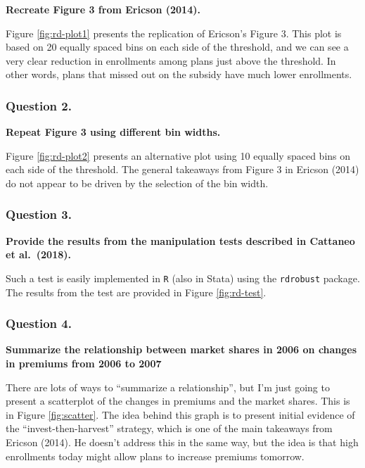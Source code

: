 \documentclass[
  12pt,
]{article}
\begin{document}
\textbf{Recreate Figure 3 from Ericson (2014).}

Figure \ref{fig:rd-plot1} presents the replication of Ericson's Figure 3. This plot is based on 20 equally spaced bins on each side of the threshold, and we can see a very clear reduction in enrollments among plans just above the threshold. In other words, plans that missed out on the subsidy have much lower enrollments.

\hypertarget{question-2.}{%
\subsubsection{Question 2.}\label{question-2.}}

\textbf{Repeat Figure 3 using different bin widths.}

Figure \ref{fig:rd-plot2} presents an alternative plot using 10 equally spaced bins on each side of the threshold. The general takeaways from Figure 3 in Ericson (2014) do not appear to be driven by the selection of the bin width.

\hypertarget{question-3.}{%
\subsubsection{Question 3.}\label{question-3.}}

\textbf{Provide the results from the manipulation tests described in Cattaneo et al.~(2018).}

Such a test is easily implemented in \texttt{R} (also in Stata) using the \texttt{rdrobust} package. The results from the test are provided in Figure \ref{fig:rd-test}.

\hypertarget{question-4.}{%
\subsubsection{Question 4.}\label{question-4.}}

\textbf{Summarize the relationship between market shares in 2006 on changes in premiums from 2006 to 2007}

There are lots of ways to ``summarize a relationship'', but I'm just going to present a scatterplot of the changes in premiums and the market shares. This is in Figure \ref{fig:scatter}. The idea behind this graph is to present initial evidence of the ``invest-then-harvest'' strategy, which is one of the main takeaways from Ericson (2014). He doesn't address this in the same way, but the idea is that high enrollments today might allow plans to increase premiums tomorrow.
\end{document}

